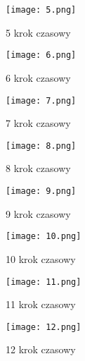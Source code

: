 \newpage
\begin{figure}
    \texttt{[image: 5.png]}
  \caption{5 krok czasowy}
  \label{5-traffic}
\end{figure}
\newpage
\begin{figure}
    \texttt{[image: 6.png]}
  \caption{6 krok czasowy}
  \label{6-traffic}
\end{figure}
\newpage
\begin{figure}
    \texttt{[image: 7.png]}
  \caption{7 krok czasowy}
  \label{7-traffic}
\end{figure}
\newpage
\begin{figure}
    \texttt{[image: 8.png]}
  \caption{8 krok czasowy}
  \label{8-traffic}
\end{figure}
\newpage
\begin{figure}
    \texttt{[image: 9.png]}
  \caption{9 krok czasowy}
  \label{9-traffic}
\end{figure}
\newpage
\begin{figure}
    \texttt{[image: 10.png]}
  \caption{10 krok czasowy}
  \label{10-traffic}
\end{figure}
\newpage
\begin{figure}
    \texttt{[image: 11.png]}
  \caption{11 krok czasowy}
  \label{11-traffic}
\end{figure}
\newpage
\begin{figure}
    \texttt{[image: 12.png]}
  \caption{12 krok czasowy}
  \label{12-traffic}
\end{figure}
